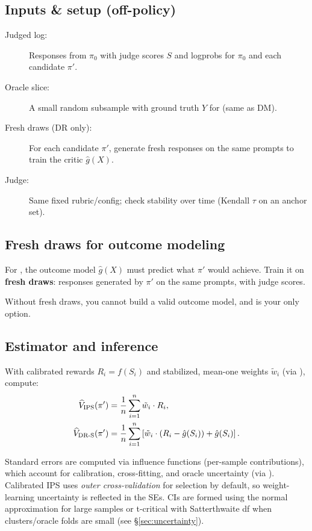 \subsection{Inputs \& setup (off-policy)}

\begin{description}
\item[Judged log:] Responses from $\pi_0$ with judge scores $S$ and logprobs for $\pi_0$ and each candidate $\pi'$.
\item[Oracle slice:] A small random subsample with ground truth $Y$ for \autocal{} (same as DM).
\item[Fresh draws (DR only):] For each candidate $\pi'$, generate fresh responses on the same prompts to train the critic $\hat{g}(X)$.
\item[Judge:] Same fixed rubric/config; check stability over time (Kendall $\tau$ on an anchor set).
\end{description}

\subsection{Fresh draws for outcome modeling}

For \dr, the outcome model $\hat{g}(X)$ must predict what $\pi'$ would achieve. Train it on \textbf{fresh draws}: responses generated by $\pi'$ on the same prompts, with judge scores.

Without fresh draws, you cannot build a valid outcome model, and \ips{} is your only option.

\subsection{Estimator and inference}

With calibrated rewards $R_i = f(S_i)$ and stabilized, mean-one weights $\tilde{w}_i$ (via \simcal), compute:
\begin{align}
\widehat{V}_{\text{IPS}}(\pi') &= \frac{1}{n} \sum_{i=1}^n \tilde{w}_i \cdot R_i, \\
\widehat{V}_{\text{DR-S}}(\pi') &= \frac{1}{n} \sum_{i=1}^n \left[ \tilde{w}_i \cdot (R_i - \hat{g}(S_i)) + \hat{g}(S_i) \right].
\end{align}

Standard errors are computed via influence functions (per-sample contributions), which account for calibration, cross-fitting, and oracle uncertainty (via \oua). Calibrated IPS uses \emph{outer cross-validation} for \simcal{} selection by default, so weight-learning uncertainty is reflected in the SEs. CIs are formed using the normal approximation for large samples or t-critical with Satterthwaite df when clusters/oracle folds are small (see \S\ref{sec:uncertainty}).

